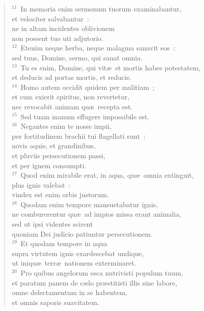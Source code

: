 \begin{verse}
${}^{11}$~In memoria enim sermonum tuorum examinabantur,\\ et velociter salvabantur~:\\ ne in altam incidentes oblivionem\\ non possent tuo uti adjutorio.\\
${}^{12}$~Etenim neque herba, neque malagma sanavit eos~:\\ sed tuus, Domine, sermo, qui sanat omnia.\\
${}^{13}$~Tu es enim, Domine, qui vit\ae\ et mortis habes potestatem,\\ et deducis ad portas mortis, et reducis.\\
${}^{14}$~Homo autem occidit quidem per malitiam~;\\ et cum exierit spiritus, non revertetur,\\ nec revocabit animam qu\ae\ recepta est.\\
${}^{15}$~Sed tuam manum effugere impossibile est.\\
${}^{16}$~Negantes enim te nosse impii,\\ per fortitudinem brachii tui flagellati sunt~:\\ novis aquis, et grandinibus,\\ et pluviis persecutionem passi,\\ et per ignem consumpti.\\
${}^{17}$~Quod enim mirabile erat, in aqua, qu\ae\ omnia extinguit,\\ plus ignis valebat~:\\ vindex est enim orbis justorum.\\
${}^{18}$~Quodam enim tempore mansuetabatur ignis,\\ ne comburerentur qu\ae\ ad impios missa erant animalia,\\ sed ut ipsi videntes scirent\\ quoniam Dei judicio patiuntur persecutionem.\\
${}^{19}$~Et quodam tempore in aqua\\ supra virtutem ignis exardescebat undique,\\ ut iniqu\ae\ terr\ae\ nationem exterminaret.\\
${}^{20}$~Pro quibus angelorum esca nutrivisti populum tuum,\\ et paratum panem de c\ae lo pr\ae stitisti illis sine labore,\\ omne delectamentum in se habentem,\\ et omnis saporis suavitatem.\\

\end{verse}
